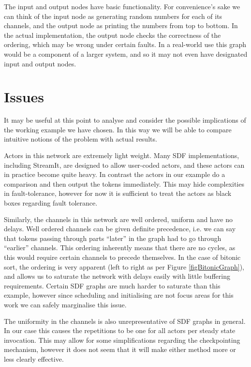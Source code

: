 The input and output nodes have basic functionality.
For convenience's sake we can think of the input node as generating random numbers for each of its channels, and the output node as printing the numbers from top to bottom.
In the actual implementation, the output node checks the correctness of the ordering, which may be wrong under certain faults.
In a real-world use this graph would be a component of a larger system, and so it may not even have designated input and output nodes.

\section{Issues}

It may be useful at this point to analyse and consider the possible implications of the working example we have chosen.
In this way we will be able to compare intuitive notions of the problem with actual results.

Actors in this network are extremely light weight.
Many SDF implementations, including StreamIt, are designed to allow user-coded actors, and these actors can in practice become quite heavy.
In contrast the actors in our example do a comparison and then output the tokens immediately.
This may hide complexities in fault-tolerance, however for now it is sufficient to treat the actors as black boxes regarding fault tolerance.

Similarly, the channels in this network are well ordered, uniform and have no delays.
Well ordered channels can be given definite precedence, i.e. we can say that tokens passing through parts ``later'' in the graph had to go through ``earlier'' channels.
This ordering inherently means that there are no cycles, as this would require certain channels to precede themselves.
In the case of bitonic sort, the ordering is very apparent (left to right as per Figure \ref{figBitonicGraph}), and allows us to saturate the network with delays easily with little buffering requirements.
Certain SDF graphs are much harder to saturate than this example, however since scheduling and initialising are not focus areas for this work we can safely marginalise this issue.

The uniformity in the channels is also unrepresentative of SDF graphs in general.
In our case this causes the repetitions to be one for all actors per steady state invocation.
This may allow for some simplifications regarding the checkpointing mechanism, however it does not seem that it will make either method more or less clearly effective.

